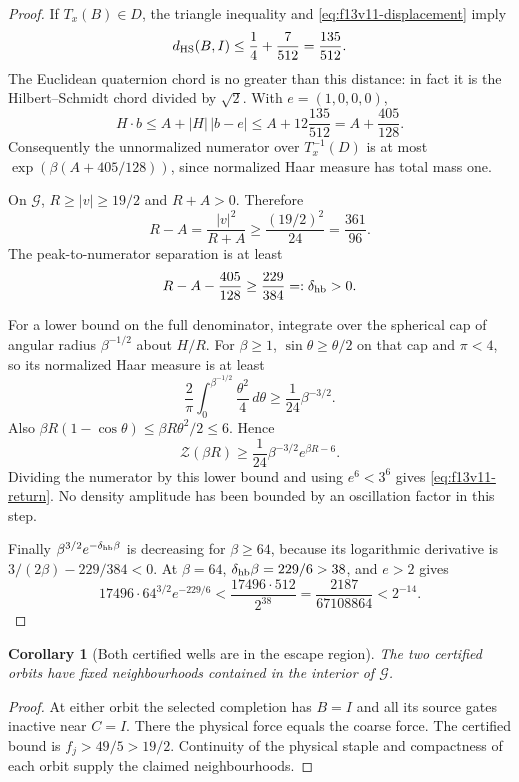 \documentclass[11pt,oneside]{article}
\newtheorem{corollary}[theorem]{Corollary}
\begin{document}
\begin{proof}
If \(T_x(B)\in D\), the triangle inequality and
\eqref{eq:f13v11-displacement} imply
\[
 d_{\rm HS}(B,I)\le\frac14+\frac7{512}
                                      =\frac{135}{512}.
\]
The Euclidean quaternion chord is no greater than
this distance: in fact it is the Hilbert--Schmidt
chord divided by \(\sqrt2\). With \(e=(1,0,0,0)\),
\[
 H\cdot b\le A+|H|\,|b-e|
          \le A+12\frac{135}{512}
          =A+\frac{405}{128}.
\]
Consequently the unnormalized numerator over
\(T_x^{-1}(D)\) is at most
\(\exp(\beta(A+405/128))\), since normalized Haar
measure has total mass one.

On \(\mathcal G\), \(R\ge|v|\ge19/2\) and
\(R+A>0\). Therefore
\[
 R-A=\frac{|v|^2}{R+A}
       \ge\frac{(19/2)^2}{24}
       =\frac{361}{96}.
\]
The peak-to-numerator separation is at least
\[
 R-A-\frac{405}{128}\ge\frac{229}{384}
                                      =:\delta_{\rm hb}>0.
\]

For a lower bound on the full denominator, integrate
over the spherical cap of angular radius
\(\beta^{-1/2}\) about \(H/R\). For \(\beta\ge1\),
\(\sin\theta\ge\theta/2\) on that cap and
\(\pi<4\), so its normalized Haar measure is at least
\[
 \frac2\pi\int_0^{\beta^{-1/2}}\frac{\theta^2}{4}\,d\theta
                   \ge\frac1{24}\beta^{-3/2}.
\]
Also
\(\beta R(1-\cos\theta)\le\beta R\theta^2/2\le6\).
Hence
\[
 \mathcal Z(\beta R)\ge
       \frac1{24}\beta^{-3/2}e^{\beta R-6}.
\]
Dividing the numerator by this lower bound and
using \(e^6<3^6\) gives \eqref{eq:f13v11-return}.
No density amplitude has been bounded by an
oscillation factor in this step.

Finally \(\beta^{3/2}e^{-\delta_{\rm hb}\beta}\)
is decreasing for \(\beta\ge64\), because its
logarithmic derivative is
\(3/(2\beta)-229/384<0\). At \(\beta=64\),
\(\delta_{\rm hb}\beta=229/6>38\), and \(e>2\) gives
\[
 17496\cdot64^{3/2}e^{-229/6}
 <\frac{17496\cdot512}{2^{38}}
 =\frac{2187}{67108864}<2^{-14}.
\]
\end{proof}

\begin{corollary}[Both certified wells are in the escape region]
\label{cor:f13v11-orbits}
The two certified orbits have fixed neighbourhoods
contained in the interior of \(\mathcal G\).
\end{corollary}

\begin{proof}
At either orbit the selected completion has \(B=I\)
and all its source gates inactive near \(C=I\).
There the physical force equals the coarse force.
The certified bound is \(f_j>49/5>19/2\).
Continuity of the physical staple and compactness
of each orbit supply the claimed neighbourhoods.
\end{proof}
\end{document}
